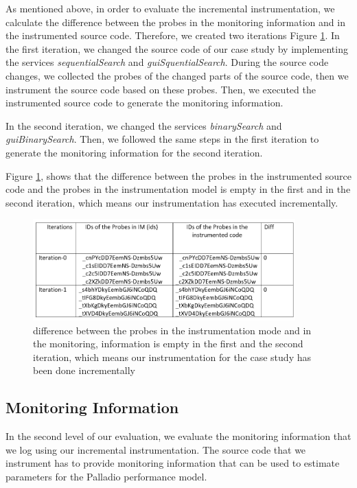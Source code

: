 As mentioned above, in order to evaluate the incremental instrumentation, we calculate the difference between the probes in the monitoring information and in the instrumented source code. Therefore, we created two iterations Figure \ref{fig:incremental_instr_eva}. In the first iteration, we changed the source code of our case study by implementing the services \textit{sequentialSearch} and \textit{guiSquentialSearch}. During the source code changes, we collected the probes of the changed parts of the source code, then we instrument the source code based on these probes. Then, we executed the instrumented source code to generate the monitoring information. 

In the second iteration, we changed the services \textit{binarySearch} and \textit{guiBinarySearch}. Then, we followed the same steps in the first iteration to generate the monitoring information for the second iteration. 


Figure \ref{fig:incremental_instr_eva}, shows that the difference between the probes in the instrumented source code and the probes in the instrumentation model is empty in the first and in the second iteration, which means our instrumentation has executed incrementally. \\ 


\begin{figure}[h]
\centering
\includegraphics[width=0.9\textwidth]{figures/incremental_instr_eva}
\caption{difference between the probes in the instrumentation mode and in the monitoring, information is empty in the first and the second iteration, which means our instrumentation for the case study has been done incrementally}
\label{fig:incremental_instr_eva}
\end{figure}



\subsection{Monitoring Information} 
\label{sec:Monitoring Information}
In the second level of our evaluation, we evaluate the monitoring information that we log using our incremental instrumentation. The source code that we instrument has to provide monitoring information that can be used to estimate parameters for the Palladio performance model. 

